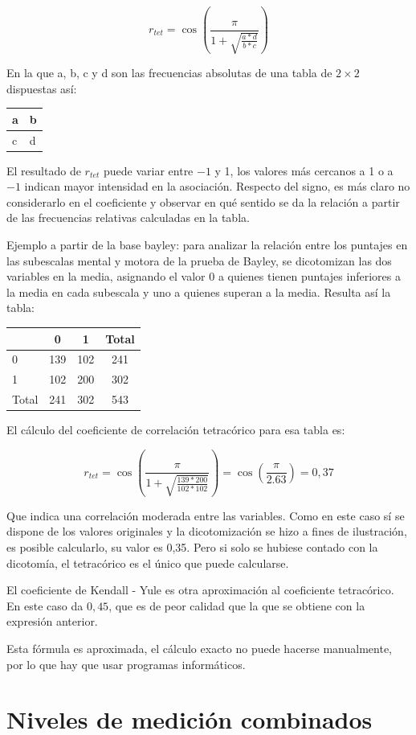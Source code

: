 \documentclass[]{book}
\begin{document}
\[r_{tet} = \cos(\frac{\pi}{1 + \sqrt{\frac{a*d}{b*c}}})\]

En la que a, b, c y d son las frecuencias absolutas de una tabla de \(2 \times 2\)
dispuestas así:

\begin{longtable}[]{@{}ll@{}}
\toprule
a & b\tabularnewline
\midrule
\endhead
c & d\tabularnewline
\bottomrule
\end{longtable}

El resultado de \(r_{tet}\) puede variar entre \(-1\) y 1, los valores
más cercanos a 1 o a \(-1\) indican mayor intensidad en la asociación.
Respecto del signo, es más claro no considerarlo en el coeficiente y
observar en qué sentido se da la relación a partir de las frecuencias
relativas calculadas en la tabla.

Ejemplo a partir de la base bayley: para analizar la relación entre los puntajes en las subescalas mental y motora de la prueba de Bayley, se dicotomizan
las dos variables en la media, asignando el valor 0 a quienes tienen
puntajes inferiores a la media en cada subescala y uno a quienes superan a la media. Resulta así la tabla:

\begin{longtable}[]{@{}lccc@{}}
\toprule
& 0 & 1 & Total\tabularnewline
\midrule
\endhead
0 & 139 & 102 & 241\tabularnewline
1 & 102 & 200 & 302\tabularnewline
Total & 241 & 302 & 543\tabularnewline
\bottomrule
\end{longtable}

El cálculo del coeficiente de correlación tetracórico para esa tabla es:

\[r_{tet} = \cos(\frac{\pi}{1 + \sqrt{\frac{139*200}{102*102}}}) = \cos{(\frac{\pi}{2.63}) = 0,37}\]

Que indica una correlación moderada entre las variables. Como en este
caso sí se dispone de los valores originales y la dicotomización se hizo a fines de ilustración, es posible calcularlo, su valor es 0,35. Pero si solo se hubiese contado con la dicotomía, el tetracórico es el único que puede calcularse.

El coeficiente de Kendall - Yule es otra aproximación al coeficiente
tetracórico. En este caso da \(0,45\), que es de peor calidad que la que se obtiene con la expresión anterior.

Esta fórmula es aproximada, el cálculo exacto no puede hacerse
manualmente, por lo que hay que usar programas informáticos.

\hypertarget{niveles-de-mediciuxf3n-combinados}{%
\section{Niveles de medición combinados}\label{niveles-de-mediciuxf3n-combinados}}
\end{document}
